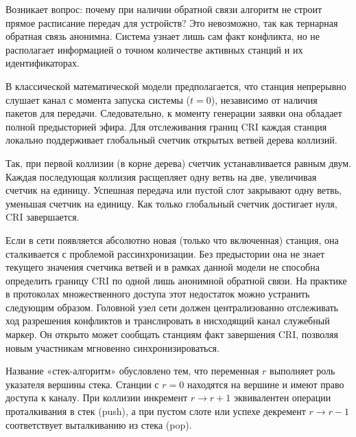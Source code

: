 \begin{note}[1]
    Возникает вопрос: почему при наличии обратной связи алгоритм не строит прямое расписание передач для устройств? Это невозможно, так как тернарная обратная связь анонимна. Система узнает лишь сам факт конфликта, но не располагает информацией о точном количестве активных станций и их идентификаторах.
\end{note}

\begin{note}[2]
    В классической математической модели предполагается, что станция непрерывно слушает канал с момента запуска системы ($t=0$), независимо от наличия пакетов для передачи. Следовательно, к моменту генерации заявки она обладает полной предысторией эфира. Для отслеживания границ CRI каждая станция локально поддерживает глобальный счетчик открытых ветвей дерева коллизий. 
    
    Так, при первой коллизии (в корне дерева) счетчик устанавливается равным двум. Каждая последующая коллизия расщепляет одну ветвь на две, увеличивая счетчик на единицу. Успешная передача или пустой слот закрывают одну ветвь, уменьшая счетчик на единицу. Как только глобальный счетчик достигает нуля, CRI завершается.
\end{note}

\begin{note}[3]
    Если в сети появляется абсолютно новая (только что включенная) станция, она сталкивается с проблемой рассинхронизации. Без предыстории она не знает текущего значения счетчика ветвей и в рамках данной модели не способна определить границу CRI по одной лишь анонимной обратной связи. На практике в протоколах множественного доступа этот недостаток можно устранить следующим образом. Головной узел сети должен централизованно отслеживать ход разрешения конфликтов и транслировать в нисходящий канал служебный маркер. Он открыто может сообщать станциям факт завершения CRI, позволяя новым участникам мгновенно синхронизироваться.
\end{note}

\begin{note}[4]
    Название «стек-алгоритм» обусловлено тем, что переменная $r$ выполняет роль указателя вершины стека. Станции с $r=0$ находятся на вершине и имеют право доступа к каналу. При коллизии инкремент $r \to r+1$ эквивалентен операции проталкивания в стек (push), а при пустом слоте или успехе декремент $r \to r-1$ соответствует выталкиванию из стека (pop).
\end{note}

